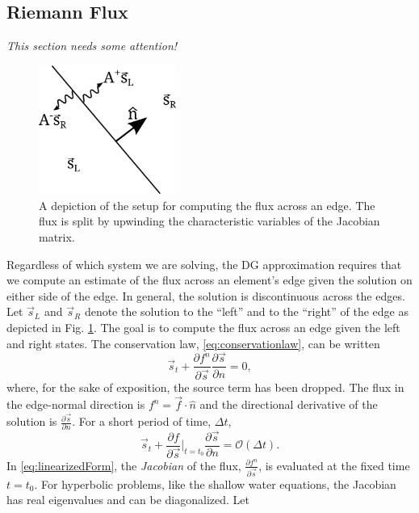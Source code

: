 \documentclass{softwaremanual}
\begin{document}
\subsection{Riemann Flux}
\textit{This section needs some attention!}\\
\begin{figure}
\begin{center}
\includegraphics[width=0.4\textwidth]{../figures/normalflux.png}
\caption{ A depiction of the setup for computing the flux across an edge. The flux is split by upwinding the characteristic variables of the Jacobian matrix. }\label{fig:normalflux}
\end{center}
\end{figure}
Regardless of which system we are solving, the DG approximation requires that we compute an estimate of the flux across an element's edge given the solution on either side of the edge. In general, the solution is discontinuous across the edges. Let $\vec{s}_L$ and $\vec{s}_R$ denote the solution to the ``left'' and to the ``right'' of the edge as depicted in Fig. \ref{fig:normalflux}. The goal is to compute the flux across an edge given the left and right states. The conservation law, \eqref{eq:conservationlaw}, can be written
\begin{equation}
\vec{s}_t + \frac{\partial f^n}{\partial \vec{s}}\frac{\partial \vec{s}}{\partial n} = 0,
\end{equation}
where, for the sake of exposition, the source term has been dropped. The flux in the edge-normal direction is $f^n = \vec{f} \cdot \hat{n}$ and the directional derivative of the solution is $\frac{\partial \vec{s}}{\partial n}$. For a short period of time, $\Delta t$,
\begin{equation}
\vec{s}_t + \frac{\partial f}{\partial \vec{s}}|_{t=t_0} \frac{\partial \vec{s}}{\partial n}  = \mathcal{O}(\Delta t). \label{eq:linearizedForm}
\end{equation}
In \eqref{eq:linearizedForm}, the \textit{Jacobian} of the flux, $\frac{\partial f^n}{\partial \vec{s}}$, is evaluated at the fixed time $t=t_0$. For hyperbolic problems, like the shallow water equations, the Jacobian has real eigenvalues and can be diagonalized. Let
\end{document}
